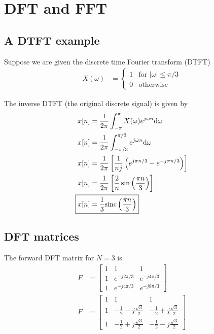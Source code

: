 \documentclass[twocolumn]{myarticle}
\newcommand{\mat}[1]{\begin{bmatrix}#1\end{bmatrix}}
\newcommand{\sinc}{\text{sinc}}
\renewcommand{\d}{\mathrm{d}}
\begin{document}
\section{DFT and FFT}
\label{sec:dft_and_fft}

\subsection{A DTFT example}
\label{subsec:a_dtft_example}

Suppose we are given the discrete time Fourier transform (DTFT)
\begin{align}
    X(\omega) &= \begin{cases} 1 & \text{for } \left| \omega \right| \leq \pi/3 \\ 0 & \text{otherwise} \end{cases}
\end{align}

The inverse DTFT (the original discrete signal) is given by
\begin{align}
    x[n] &= \frac{1}{2\pi} \int_{-\pi}^{\pi} X(\omega) e^{j \omega n} \d \omega
    \\
    x[n] &= \frac{1}{2\pi} \int_{-\pi/3}^{\pi/3} e^{j \omega n} \d \omega
    \\
    x[n] &= \frac{1}{2\pi} \left[ \frac{1}{n j} \left( e^{j \pi n / 3} - e^{-j \pi n /3} \right) \right]
    \\
    x[n] &= \frac{1}{2\pi} \left[ \frac{2}{n} \sin\left( \frac{\pi n}{3}\right) \right]
    \\
    \Aboxed{x[n] &= \frac{1}{3} \sinc\left( \frac{\pi n}{3}\right)}
\end{align}

\subsection{DFT matrices}
\label{subsec:dft_matrices}

The forward DFT matrix for $ N = 3 $ is
\begin{align}
    F &= \mat{ 1 & 1 & 1 \\ 1 & e^{-j 2 \pi / 3} & e^{-j 4 \pi / 3} \\ 1 & e^{-j 4 \pi / 3} & e^{-j 8 \pi / 3}}
    \\
    F &= \mat{ 1 & 1 & 1 \\ 1 & -\frac{1}{2} - j \frac{\sqrt{3}}{2} & -\frac{1}{2} + j \frac{\sqrt{3}}{2} \\ 1 & -\frac{1}{2} + j \frac{\sqrt{3}}{2} &-\frac{1}{2} - j \frac{\sqrt{3}}{2} }
\end{align}
\end{document}
